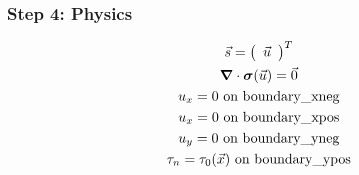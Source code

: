 \documentclass[aspectratio=169]{beamer}
\begin{document}
\begin{frame}
  \frametitle{Step 4: Physics}
  \summary{}

  \begin{minipage}{0.3\textwidth}
    {\scriptsize
      \begin{gather*}
        \vec{s} = \left(\begin{array}{c} \vec{u} \end{array}\right)^T \\
        \bm{\nabla} \cdot \bm{\sigma}(\vec{u}) = \vec{0} \\
        u_x = 0 \text{ on boundary\_xneg} \\
        u_x = 0 \text{ on boundary\_xpos} \\
        u_y = 0 \text{ on boundary\_yneg} \\
        \tau_n = \tau_0(\vec{x}) \text{ on boundary\_ypos}
    \end{gather*}}
  \end{minipage}
  \hfill
  \begin{minipage}{0.67\textwidth}
  \end{minipage}
      
\end{frame}
\end{document}
